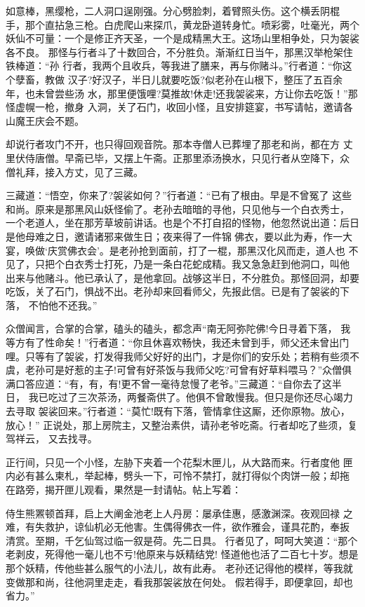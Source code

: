 如意棒，黑缨枪，二人洞口逞刚强。分心劈脸刺，着臂照头伤。这个横丢阴棍
手，那个直拈急三枪。白虎爬山来探爪，黄龙卧道转身忙。喷彩雾，吐毫光，两个
妖仙不可量：一个是修正齐天圣，一个是成精黑大王。这场山里相争处，只为袈裟
各不良。
那怪与行者斗了十数回合，不分胜负。渐渐红日当午，那黑汉举枪架住铁棒道：“孙
行者，我两个且收兵，等我进了膳来，再与你赌斗。”行者道：“你这个孽畜，教做
汉子?好汉子，半日儿就要吃饭?似老孙在山根下，整压了五百余年，也未曾尝些汤
水，那里便饿哩?莫推故!休走!还我袈裟来，方让你去吃饭！”那怪虚幌一枪，撤身
入洞，关了石门，收回小怪，且安排筵宴，书写请帖，邀请各山魔王庆会不题。

却说行者攻门不开，也只得回观音院。那本寺僧人已葬埋了那老和尚，都在方
丈里伏侍唐僧。早斋已毕，又摆上午斋。正那里添汤换水，只见行者从空降下，众
僧礼拜，接入方丈，见了三藏。

三藏道：“悟空，你来了?袈裟如何？”行者道：“已有了根由。早是不曾冤了
这些和尚。原来是那黑风山妖怪偷了。老孙去暗暗的寻他，只见他与一个白衣秀士，
一个老道人，坐在那芳草坡前讲话。也是个不打自招的怪物，他忽然说出道：后日
是他母难之日，邀请诸邪来做生日；夜来得了一件锦佛衣，要以此为寿，作一大
宴，唤做‘庆赏佛衣会’。是老孙抢到面前，打了一棍，那黑汉化风而走，道人也
不见了，只把个白衣秀士打死，乃是一条白花蛇成精。我又急急赶到他洞口，叫他
出来与他赌斗。他已承认了，是他拿回。战够这半日，不分胜负。那怪回洞，却要
吃饭，关了石门，惧战不出。老孙却来回看师父，先报此信。已是有了袈裟的下落，
不怕他不还我。”

众僧闻言，合掌的合掌，磕头的磕头，都念声“南无阿弥陀佛!今日寻着下落，
我等方有了性命矣！”行者道：“你且休喜欢畅快，我还未曾到手，师父还未曾出门
哩。只等有了袈裟，打发得我师父好好的出门，才是你们的安乐处；若稍有些须不
虞，老孙可是好惹的主子!可曾有好茶饭与我师父吃?可曾有好草料喂马？”众僧俱
满口答应道：“有，有，有!更不曾一毫待怠慢了老爷。”三藏道：“自你去了这半日，
我已吃过了三次茶汤，两餐斋供了。他俱不曾敢慢我。但只是你还尽心竭力去寻取
袈裟回来。”行者道：“莫忙!既有下落，管情拿住这厮，还你原物。放心，放心！”
正说处，那上房院主，又整治素供，请孙老爷吃斋。行者却吃了些须，复驾祥云，
又去找寻。

正行间，只见一个小怪，左胁下夹着一个花梨木匣儿，从大路而来。行者度他
匣内必有甚么柬札，举起棒，劈头一下，可怜不禁打，就打得似个肉饼一般；却拖
在路旁，揭开匣儿观看，果然是一封请帖。帖上写着：

侍生熊罴顿首拜，启上大阐金池老上人丹房：屡承佳惠，感激渊深。夜观回禄
之难，有失救护，谅仙机必无他害。生偶得佛衣一件，欲作雅会，谨具花酌，奉扳
清赏。至期，千乞仙驾过临一叙是荷。先二日具。
行者见了，呵呵大笑道：“那个老剥皮，死得他一毫儿也不亏!他原来与妖精结党!
怪道他也活了二百七十岁。想是那个妖精，传他些甚么服气的小法儿，故有此寿。
老孙还记得他的模样，等我就变做那和尚，往他洞里走走，看我那袈裟放在何处。
假若得手，即便拿回，却也省力。”

